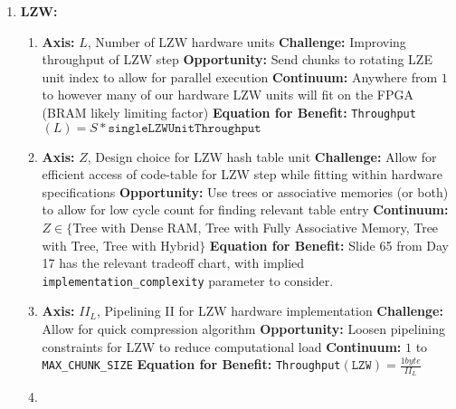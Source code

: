 \documentclass{article}
\begin{document}
\begin{enumerate}
\begin{enumerate}
\end{enumerate}
\item%
\textbf{LZW:}
\begin{enumerate}
\item%

\textbf{Axis:} $L$, Number of LZW hardware units
\newline
\textbf{Challenge:} Improving throughput of LZW step
\newline
\textbf{Opportunity:} Send chunks to rotating LZE unit index to allow for parallel execution
\newline
\textbf{Continuum:} Anywhere from $1$ to however many of our hardware LZW units will fit on the FPGA (BRAM likely limiting factor)
\newline
\textbf{Equation for Benefit:} \texttt{Throughput}$\left(L\right)=S*\texttt{singleLZWUnitThroughput}$

\item%

\textbf{Axis:} $Z$, Design choice for LZW hash table unit
\newline
\textbf{Challenge:} Allow for efficient access of code-table for LZW step while fitting within hardware specifications
\newline
\textbf{Opportunity:} Use trees or associative memories (or both) to allow for low cycle count for finding relevant table entry
\newline
\textbf{Continuum:} $Z\in\{$Tree with Dense RAM, Tree with Fully Associative Memory, Tree with Tree, Tree with Hybrid$\}$
\newline
\textbf{Equation for Benefit:} Slide 65 from Day 17 has the relevant tradeoff chart, with implied \texttt{implementation\_complexity} parameter to consider.

\item%

\textbf{Axis:} $II_L$, Pipelining II for LZW hardware implementation
\newline
\textbf{Challenge:} Allow for quick compression algorithm
\newline
\textbf{Opportunity:} Loosen pipelining constraints for LZW to reduce computational load
\newline
\textbf{Continuum:} $1$ to \texttt{MAX\_CHUNK\_SIZE}
\newline
\textbf{Equation for Benefit:} \texttt{Throughput}$\left(\texttt{LZW}\right)=\frac{1 byte}{II_L}$

\item%


\end{enumerate}
\end{enumerate}
\end{document}
